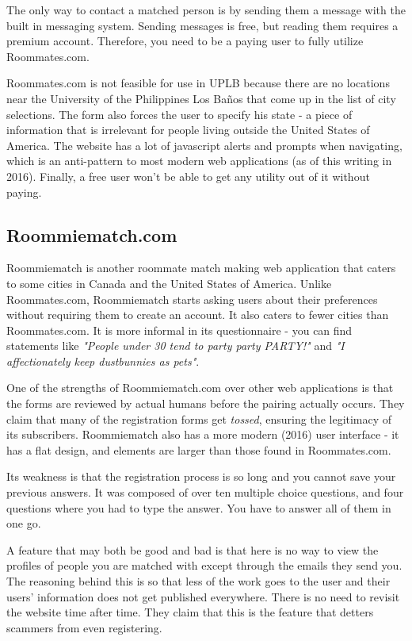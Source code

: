 \documentclass[journal]{./IEEE/IEEEtran}
\newcommand{\UPLB}{University of the Philippines Los Ba\~{n}os }
\begin{document}
The only way to contact a matched person is by sending them a message with the built in messaging system. Sending messages is free, but reading them requires a premium account. Therefore, you need to be a paying user to fully utilize Roommates.com.

Roommates.com is not feasible for use in UPLB because there are no locations near the \UPLB that come up in the list of city selections. The form also forces the user to specify his state - a piece of information that is irrelevant for people living outside the United States of America. The website has a lot of javascript alerts and prompts when navigating, which is an anti-pattern to most modern web applications (as of this writing in 2016). Finally, a free user won't be able to get any utility out of it without paying.

\subsection{Roommiematch.com}
Roommiematch is another roommate match making web application that caters to some cities in Canada and the United States of America. Unlike Roommates.com, Roommiematch starts asking users about their preferences without requiring them to create an account. It also caters to fewer cities than Roommates.com. It is more informal in its questionnaire - you can find statements like \textit{"People under 30 tend to party party PARTY!"} and \textit{"I affectionately keep dustbunnies as pets"}.

One of the strengths of Roommiematch.com over other web applications is that the forms are reviewed by actual humans before the pairing actually occurs. They claim that many of the registration forms get \textit{tossed}, ensuring the legitimacy of its subscribers. Roommiematch also has a more modern (2016) user interface - it has a flat design, and elements are larger than those found in Roommates.com.

Its weakness is that the registration process is so long and you cannot save your previous answers. It was composed of over ten multiple choice questions, and four questions where you had to type the answer. You have to answer all of them in one go.

A feature that may both be good and bad is that here is no way to view the profiles of people you are matched with except through the emails they send you. The reasoning behind this is so that less of the work goes to the user and their users' information does not get published everywhere. There is no need to revisit the website time after time. They claim that this is the feature that detters scammers from even registering.
\end{document}
